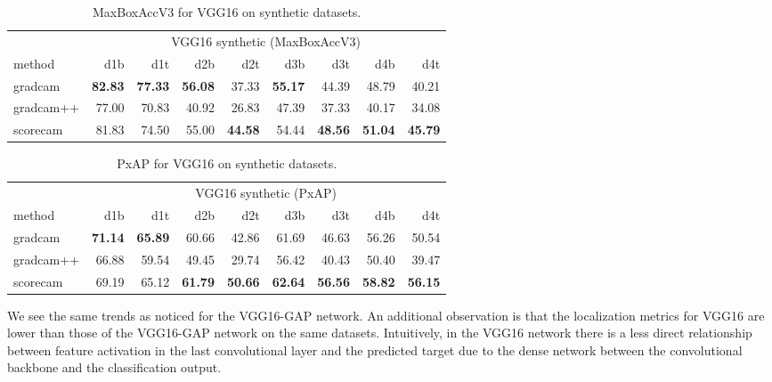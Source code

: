 \begin{table}[ht]
\centering
\begin{tabular}{lrrrrrrrr}
\toprule
 & \multicolumn{8}{c}{VGG16 synthetic (MaxBoxAccV3)} \\
method & d1b & d1t & d2b & d2t & d3b & d3t & d4b & d4t \\
\cmidrule(lr){1-1} \cmidrule(lr){2-9} 
gradcam & \bfseries 82.83 & \bfseries 77.33 & \bfseries 56.08 & 37.33 & \bfseries 55.17 & 44.39 & 48.79 & 40.21 \\
gradcam++ & 77.00 & 70.83 & 40.92 & 26.83 & 47.39 & 37.33 & 40.17 & 34.08 \\
scorecam & 81.83 & 74.50 & 55.00 & \bfseries 44.58 & 54.44 & \bfseries 48.56 & \bfseries 51.04 & \bfseries 45.79 \\
\bottomrule
\end{tabular}
\caption[MaxBoxAccV3 for VGG16 on synthetic datasets]{MaxBoxAccV3 for VGG16 on synthetic datasets.}
\label{tab:maxboxaccv3_vgg16_base_synthetic}
\end{table}
\begin{table}[h]
\centering
\begin{tabular}{lrrrrrrrr}
\toprule
 & \multicolumn{8}{c}{VGG16 synthetic (PxAP)} \\
method & d1b & d1t & d2b & d2t & d3b & d3t & d4b & d4t \\
\cmidrule(lr){1-1} \cmidrule(lr){2-9} 
gradcam & \bfseries 71.14 & \bfseries 65.89 & 60.66 & 42.86 & 61.69 & 46.63 & 56.26 & 50.54 \\
gradcam++ & 66.88 & 59.54 & 49.45 & 29.74 & 56.42 & 40.43 & 50.40 & 39.47 \\
scorecam & 69.19 & 65.12 & \bfseries 61.79 & \bfseries 50.66 & \bfseries 62.64 & \bfseries 56.56 & \bfseries 58.82 & \bfseries 56.15 \\
\bottomrule
\end{tabular}
\caption[PxAP for VGG16 on synthetic datasets]{PxAP for VGG16 on synthetic datasets.}
\label{tab:pxap_vgg16_base_synthetic}
\end{table}

We see the same trends as noticed for the VGG16-GAP network. An additional observation is that the localization metrics for VGG16 are lower than those of the VGG16-GAP network on the same datasets. Intuitively, in the VGG16 network there is a less direct relationship between feature activation in the last convolutional layer and the predicted target due to the dense network between the convolutional backbone and the classification output.

